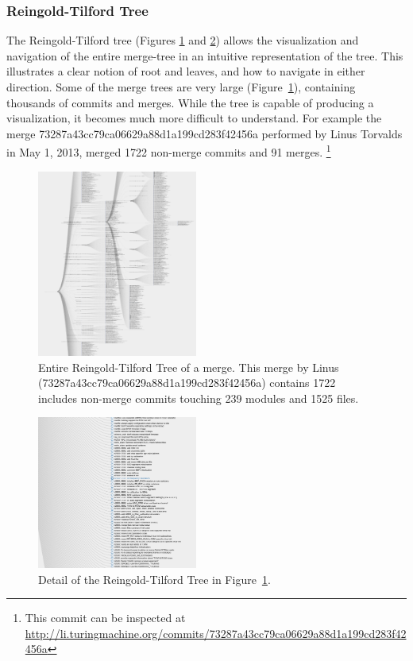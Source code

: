 \documentclass[conference, draftclsnofoot, draft]{IEEEtran}
\begin{document}
\subsubsection{Reingold-Tilford Tree}

The Reingold-Tilford tree\cite{Reingold1981} (Figures \ref{fig:zoomed_tree} and
\ref{fig:tree}) allows the visualization and navigation of the entire merge-tree in
an intuitive representation of the tree.  This illustrates a clear notion of root
and leaves, and how to navigate in either direction. Some of the merge trees are
very large (Figure~\ref{fig:zoomed_tree}), containing thousands of commits and
merges. While the tree is capable of producing a visualization, it becomes much more
difficult to understand. For example the merge
73287a43cc79ca06629a88d1a199cd283f42456a performed by Linus Torvalds in May 1, 2013,
merged 1722 non-merge commits and 91 merges. \footnote{
        This commit can be inspected at
        \url{http://li.turingmachine.org/commits/73287a43cc79ca06629a88d1a199cd283f42456a}}

\begin{figure}
        \centering
        \includegraphics[width=0.47\textwidth]{figures/tree_zoom.png}
        \caption{Entire Reingold-Tilford Tree of a merge. This merge by Linus (73287a43cc79ca06629a88d1a199cd283f42456a) contains 1722 includes non-merge commits
                touching 239 modules and 1525 files.}
        \label{fig:zoomed_tree}
\end{figure}


\begin{figure}
        \centering
        \includegraphics[width=0.47\textwidth]{figures/tree_view.png}
        \caption{Detail of the Reingold-Tilford Tree in Figure~\ref{fig:zoomed_tree}.}
        \label{fig:tree}
\end{figure}
\end{document}
